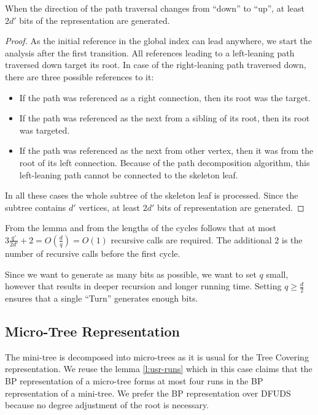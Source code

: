 \begin{lemma}
	When the direction of the path traversal changes from ``down'' to ``up'', at least $2d'$ bits of the representation are generated.
\end{lemma}
\begin{proof}
	As the initial reference in the global index can lead anywhere, we start the analysis after the first transition.
	All references leading to a left-leaning path traversed down target its root.
	In case of the right-leaning path traversed down, there are three possible references to it:
	\begin{itemize}
		\item If the path was referenced as a right connection, then its root was the target.
		\item If the path was referenced as the next from a sibling of its root, then its root was targeted.
		\item If the path was referenced as the next from other vertex, then it was from the root of its left connection.
		Because of the path decomposition algorithm, this left-leaning path cannot be connected to the skeleton leaf.
	\end{itemize}

	In all these cases the whole subtree of the skeleton leaf is processed.
	Since the subtree contains $d'$ vertices, at least $2d'$ bits of representation are generated.
\end{proof}

From the lemma and from the lengths of the cycles follows that at most $3 \frac{q'}{2d'} + 2 = O(\frac{d}{q}) = O(1)$ recursive calls are required.
The additional $2$ is the number of recursive calls before the first cycle.

Since we want to generate as many bits as possible, we want to set $q$ small, however that results in deeper recursion and longer running time.
Setting $q \ge \frac{d}{2}$ ensures that a single ``Turn'' generates enough bits.

\subsection{Micro-Tree Representation}

The mini-tree is decomposed into micro-trees as it is usual for the Tree Covering representation.
We reuse the lemma \ref{l:usr-runs} which in this case claims that the BP representation of a micro-tree forms at most four runs in the BP representation of a mini-tree.
We prefer the BP representation over DFUDS because no degree adjustment of the root is necessary.

